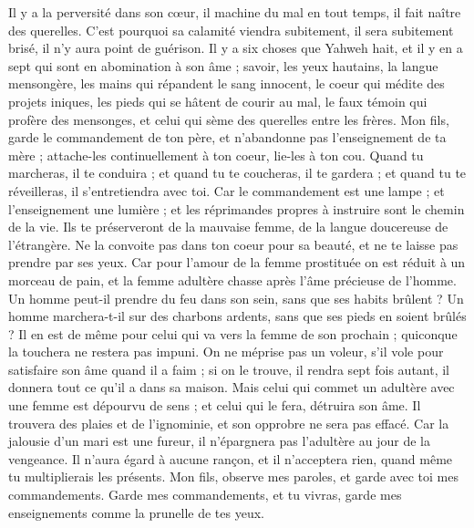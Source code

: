 \begin{multicols}{2}
Il y a la perversité dans son cœur, il machine du mal en tout temps, il fait naître des querelles.
C'est pourquoi sa calamité viendra subitement, il sera subitement brisé, il n'y aura point de guérison.
Il y a six choses que Yahweh hait, et il y en a sept qui sont en abomination à son âme ;
savoir, les yeux hautains, la langue mensongère, les mains qui répandent le sang innocent,
le coeur qui médite des projets iniques, les pieds qui se hâtent de courir au mal,
le faux témoin qui profère des mensonges, et celui qui sème des querelles entre les frères.
Mon fils, garde le commandement de ton père, et n'abandonne pas l'enseignement de ta mère ;
attache-les continuellement à ton coeur, lie-les à ton cou.
Quand tu marcheras, il te conduira ; et quand tu te coucheras, il te gardera ; et quand tu te réveilleras, il s'entretiendra avec toi.
Car le commandement est une lampe ; et l'enseignement une lumière ; et les réprimandes propres à instruire sont le chemin de la vie.
Ils te préserveront de la mauvaise femme, de la langue doucereuse de l'étrangère.
Ne la convoite pas dans ton coeur pour sa beauté, et ne te laisse pas prendre par ses yeux.
Car pour l'amour de la femme prostituée on est réduit à un morceau de pain, et la femme adultère chasse après l'âme précieuse de l'homme.
Un homme peut-il prendre du feu dans son sein, sans que ses habits brûlent ?
Un homme marchera-t-il sur des charbons ardents, sans que ses pieds en soient brûlés ?
Il en est de même pour celui qui va vers la femme de son prochain ; quiconque la touchera ne restera pas impuni.
On ne méprise pas un voleur, s'il vole pour satisfaire son âme quand il a faim ;
si on le trouve, il rendra sept fois autant, il donnera tout ce qu'il a dans sa maison.
Mais celui qui commet un adultère avec une femme est dépourvu de sens ; et celui qui le fera, détruira son âme.
Il trouvera des plaies et de l'ignominie, et son opprobre ne sera pas effacé.
Car la jalousie d'un mari est une fureur, il n'épargnera pas l'adultère au jour de la vengeance.
Il n'aura égard à aucune rançon, et il n'acceptera rien, quand même tu multiplierais les présents.
\VerseOne{}Mon fils, observe mes paroles, et garde avec toi mes commandements.
Garde mes commandements, et tu vivras, garde mes enseignements comme la prunelle de tes yeux.

\end{multicols}
